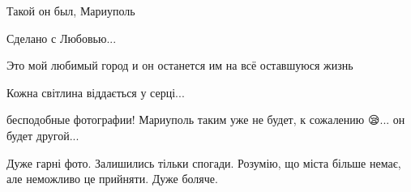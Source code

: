 
Такой он был, Мариуполь

Сделано с Любовью...

Это мой любимый город и он останется им на всё оставшуюся жизнь

Кожна світлина віддається у серці...


бесподобные фотографии! Мариуполь таким уже не будет, к сожалению 😪... он будет другой...


Дуже гарні фото. Залишились тільки спогади. Розумію, що міста більше немає, але
неможливо це прийняти. Дуже боляче.
